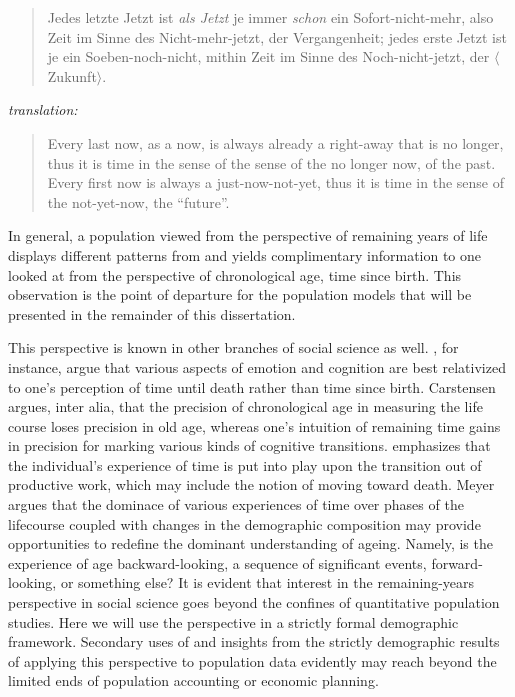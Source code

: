  \FloatBarrier
 
\begin{singlespace}
\begin{quote}
Jedes letzte Jetzt ist \textit{als Jetzt} je immer \textit{schon} ein
Sofort-nicht-mehr, also Zeit im Sinne des Nicht-mehr-jetzt, der Vergangenheit;
jedes erste Jetzt ist je ein Soeben-noch-nicht, mithin Zeit im Sinne des
Noch-nicht-jetzt, der $\langle$Zukunft$\rangle$.
\citep[p424][]{heidegger1977sein}
\end{quote}
\textit{translation:}
\begin{quote}
Every last now, as a now, is always already a right-away that is no longer, thus
it is time in the sense of the sense of the no longer now, of the past. Every
first now is always a just-now-not-yet, thus it is time in the sense of the
not-yet-now, the ``future''. \citep{stambaugh1996being}
\end{quote}
\end{singlespace}

In general, a population viewed from the
perspective of remaining years of life displays different patterns 
from and yields complimentary information to one looked at from the
perspective of chronological age, time since birth. This observation is the
point of departure for the population models that will be presented in the remainder of this
dissertation. 

This perspective is known in other branches of social science as well.
 \citet{carstensen2006influence,carstensen1999taking}, 
for instance, argue that various aspects of emotion and cognition are best 
relativized to one's perception of time until
death rather than time since birth. Carstensen argues, inter alia, that the
precision of chronological age in measuring the life course loses precision in old age,
whereas one's intuition of remaining time gains in precision for marking various
kinds of cognitive transitions. \citet{meyer2008altern} emphasizes that the
individual's experience of time is put into play upon the transition out of
productive work, which may include the notion of moving toward death. Meyer
argues that the dominace of various experiences of time over phases of the
lifecourse coupled with changes in the demographic composition may provide
opportunities to redefine the dominant understanding of ageing. Namely, is
the experience of age backward-looking, a sequence of significant events,
forward-looking, or something else? It is evident that interest in the
remaining-years perspective in social science goes beyond the
confines of quantitative population studies. Here we will use the perspective in
a strictly formal demographic framework. Secondary uses of and insights from the
strictly demographic results of applying this perspective to population data
evidently may reach beyond the limited ends of population accounting or
economic planning.

